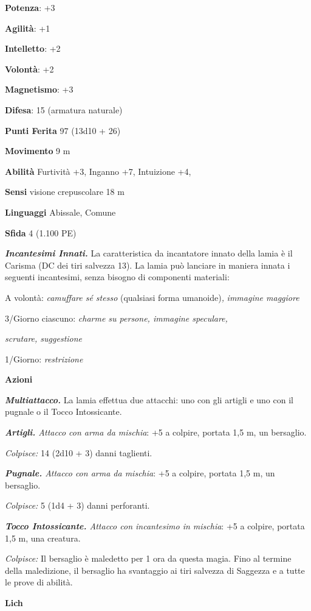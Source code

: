 \begin{multicols}{2}
\textbf{Potenza}: +3

\textbf{Agilità}: +1

\textbf{Intelletto}: +2

\textbf{Volontà}: +2

\textbf{Magnetismo}: +3

\textbf{Difesa}: 15 (armatura naturale)

\textbf{Punti Ferita} 97 (13d10 + 26)

\textbf{Movimento} 9 m

\textbf{Abilità} Furtività +3, Inganno +7, Intuizione +4,

\textbf{Sensi} visione crepuscolare 18 m

\textbf{Linguaggi} Abissale, Comune

\textbf{Sfida} 4 (1.100 PE)

\emph{\textbf{Incantesimi Innati.}} La caratteristica da incantatore
innato della lamia è il Carisma (DC dei tiri salvezza 13). La lamia può
lanciare in maniera innata i seguenti incantesimi, senza bisogno di
componenti materiali:

A volontà: \emph{camuffare sé stesso} (qualsiasi forma umanoide)\emph{,}
\emph{immagine maggiore}

3/Giorno ciascuno: \emph{charme su persone, immagine speculare,}

\emph{scrutare, suggestione}

1/Giorno: \emph{restrizione}

\textbf{Azioni}

\emph{\textbf{Multiattacco.}} La lamia effettua due attacchi: uno con
gli artigli e uno con il pugnale o il Tocco Intossicante.

\emph{\textbf{Artigli.} Attacco con arma da mischia}: +5 a colpire,
portata 1,5 m, un bersaglio.

\emph{Colpisce:} 14 (2d10 + 3) danni taglienti.

\emph{\textbf{Pugnale.} Attacco con arma da mischia}: +5 a colpire,
portata 1,5 m, un bersaglio.

\emph{Colpisce:} 5 (1d4 + 3) danni perforanti.

\emph{\textbf{Tocco Intossicante.} Attacco con incantesimo in mischia}:
+5 a colpire, portata 1,5 m, una creatura.

\emph{Colpisce:} Il bersaglio è maledetto per 1 ora da questa magia.
Fino al termine della maledizione, il bersaglio ha svantaggio ai tiri
salvezza di Saggezza e a tutte le prove di abilità.

\textbf{Lich}


\end{multicols}
